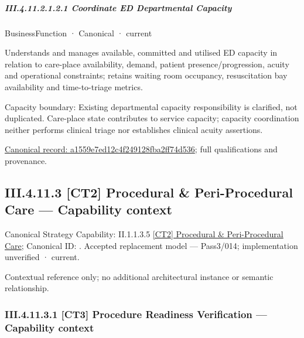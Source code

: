 \subparagraph*{III.4.11.2.1.2.1 Coordinate ED Departmental Capacity}
\label{navigation:III.4.11.2.1.2.1}

\label{element:a1559e7ed12c4f249128fba2ff74d536}
{\small BusinessFunction · Canonical · current}\par

Understands and manages available, committed and utilised ED capacity in relation to care-place availability, demand, patient presence/progression, acuity and operational constraints; retains waiting room occupancy, resuscitation bay availability and time-to-triage metrics.



Capacity boundary: Existing departmental capacity responsibility is clarified, not duplicated. Care-place state contributes to service capacity; capacity coordination neither performs clinical triage nor establishes clinical acuity assertions.


{\footnotesize \href{../../../../../../../../continuum/business/business-function/a1559e7ed12c4f249128fba2ff74d536.md}{Canonical record: a1559e7ed12c4f249128fba2ff74d536}; full qualifications and provenance.}\par
\subsection*{III.4.11.3 [CT2] Procedural \& Peri-Procedural Care — Capability context}
\label{navigation:III.4.11.3}

{\small Canonical Strategy Capability: II.1.1.3.5 \hyperref[element:2f1e08ecaf7e4d589582c26d7e8966f1]{[CT2] Procedural \& Peri-Procedural Care}; Canonical ID: \texttt{}. Accepted replacement model — Pass3/014; implementation unverified · current.}\par
Contextual reference only; no additional architectural instance or semantic relationship.\par
\subsubsection*{III.4.11.3.1 [CT3] Procedure Readiness Verification — Capability context}
\label{navigation:III.4.11.3.1}

